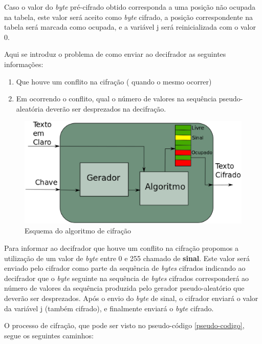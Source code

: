 Caso o valor do \textit{byte} pré-cifrado obtido corresponda a uma posição não ocupada na tabela, este valor será aceito como \textit{byte} cifrado, a posição correspondente na tabela será marcada como ocupada, e a variável j será reinicializada com o valor 0.

Aqui se introduz o problema de como enviar ao decifrador as seguintes informações:

\begin{enumerate}
	\item Que houve um conflito na cifração ( quando o mesmo ocorrer)
	\item Em ocorrendo o conflito, qual o número de valores na sequência pseudo-aleatória deverão ser desprezados na decifração.
\end{enumerate}


\begin{figure}[h]
	\centering
	\includegraphics[scale=0.4]{figuras/funcionamento.eps}
	\caption{Esquema do algoritmo de cifração}
\end{figure}

Para informar ao decifrador que houve um conflito na cifração propomos a utilização de um valor de \textit{byte} entre 0 e 255 chamado de \textbf{sinal}. Este valor será enviado pelo cifrador como parte da sequência de \textit{bytes} cifrados indicando ao decifrador que o \textit{byte} seguinte na sequência de \textit{bytes} cifrados corresponderá ao número de valores da sequência produzida pelo gerador pseudo-aleatório que deverão ser desprezados.  Após o envio do \textit{byte} de sinal, o cifrador  enviará o valor da variável j (também cifrado), e finalmente enviará o \textit{byte} cifrado.

O processo de cifração, que pode ser visto no pseudo-código \ref{pseudo-codigo}, segue os seguintes caminhos:


